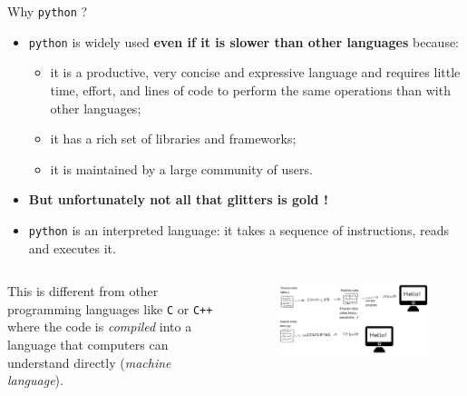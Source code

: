 \documentclass{beamer}
\begin{document}
\begin{frame}{Why \texttt{python} ?}
  \begin{itemize}
  \item \texttt{python} is widely used \textbf{even if it is slower than other languages} because:
    \begin{itemize}
    \item it is a productive, very concise and expressive language and requires little time, effort, and lines of code to perform the same operations than with other languages;
    \item it has a rich set of libraries and frameworks;
    \item it is maintained by a large community of users.
    \end{itemize}

    \item \textbf{But unfortunately not all that glitters is gold !}

    \item \texttt{python} is an interpreted language: it takes a sequence of instructions, reads and executes it.
  \end{itemize}
  
  \begin{columns}
    This is different from other programming languages like \texttt{C} or \texttt{C++} where the code is \emph{compiled} into a language that computers can understand directly (\emph{machine language}).
    \begin{figure}[h]
      \begin{center}
        \includegraphics[width=0.8\linewidth]{compiled_vs_interpreted}
      \end{center}
    \end{figure}
  \end{columns}
\end{frame}
\end{document}
